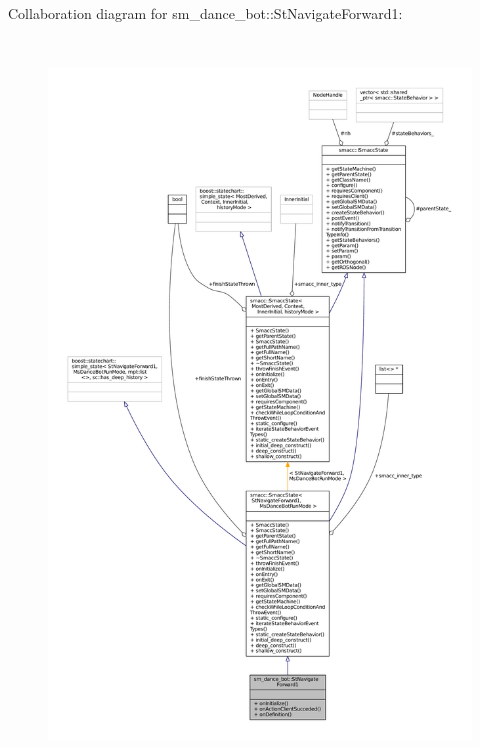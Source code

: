 Collaboration diagram for sm\+\_\+dance\+\_\+bot\+:\+:St\+Navigate\+Forward1\+:
\nopagebreak
\begin{figure}[H]
\begin{center}
\leavevmode
\includegraphics[height=550pt]{structsm__dance__bot_1_1StNavigateForward1__coll__graph}
\end{center}
\end{figure}
